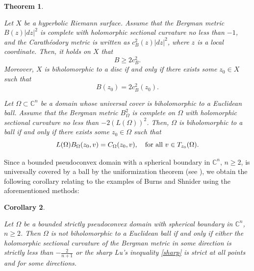 \documentclass[12pt] {article}
\newtheorem{theorem}{Theorem}[section]
\newtheorem{cor}[theorem]{Corollary}
\numberwithin{equation}{section}
\begin{document}
    \medskip
    





  
   
\begin{theorem} \label{rigidity}


 

\item [{$\bf A$.}] Let $X$ be a hyperbolic Riemann surface.
Assume that the Bergman metric $B(z)|dz|^2$ is complete with holomorphic sectional curvature no less than \(-1\), 
and 
the Carath\'eodory metric is written as $c^2_B(z) |dz|^2$,
where $z$ is a local coordinate.
Then, it holds on $X$ that
 $$
{B} \geq   2c^2_B.
 $$
Moreover, $X$ is biholomorphic to a disc if and only if there exists some $z_0 \in X$ such that
$$
B(z_0) =   2 c^2_B(z_0).
$$



 \item [{$\bf B$.}]

Let $\Omega \subset \mathbb{C}^n$ be a  domain whose
  universal cover  is biholomorphic to a Euclidean ball. Assume that  the   Bergman metric $B^2_{\Omega}$  is complete on $\Omega$ with holomorphic sectional curvature no less than $-2(L(\Omega))^2$. Then, $\Omega$ is biholomorphic to a ball  if and only if   there exists some  $z_0 \in \Omega$ such that 
$$
 L(\Omega) B_\Omega (z_0, v) = C_{\Omega} (z_0, v), \quad \text{for all\,} \, v\in T_{z_0}(\Omega). 
$$
   
 

\end{theorem}  






\medskip


 



Since a bounded pseudoconvex domain with a spherical boundary in \(\mathbb{C}^n\), \(n \geq 2\), is universally covered by a ball by the uniformization theorem (see \cite[Theorem A.2]{NS}), we obtain the following corollary   relating to the examples of Burns and Shnider \cite{BS1976} using the aforementioned methods:
 


\medskip


\begin{cor} \label{cor}




{\it Let $\Omega$ be a bounded strictly pseudoconvex domain  with spherical boundary in $\mathbb{C}^n$, $n \geq 2$. Then 
$\Omega$ is not biholomorphic to a Euclidean ball if and only if either the 
holomorphic sectional curvature of the Bergman metric   in some direction is strictly less than 
$-\frac{2}{n+1}$ or the sharp Lu's inequality \eqref{sharp} is strict at all points and for some directions.}



\end{cor}  
\end{document}

